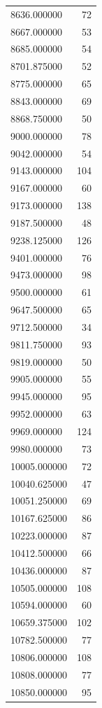 \begin{tabular}{lr}
8636.000000   &    72 \\
8667.000000   &    53 \\
8685.000000   &    54 \\
8701.875000   &    52 \\
8775.000000   &    65 \\
8843.000000   &    69 \\
8868.750000   &    50 \\
9000.000000   &    78 \\
9042.000000   &    54 \\
9143.000000   &   104 \\
9167.000000   &    60 \\
9173.000000   &   138 \\
9187.500000   &    48 \\
9238.125000   &   126 \\
9401.000000   &    76 \\
9473.000000   &    98 \\
9500.000000   &    61 \\
9647.500000   &    65 \\
9712.500000   &    34 \\
9811.750000   &    93 \\
9819.000000   &    50 \\
9905.000000   &    55 \\
9945.000000   &    95 \\
9952.000000   &    63 \\
9969.000000   &   124 \\
9980.000000   &    73 \\
10005.000000  &    72 \\
10040.625000  &    47 \\
10051.250000  &    69 \\
10167.625000  &    86 \\
10223.000000  &    87 \\
10412.500000  &    66 \\
10436.000000  &    87 \\
10505.000000  &   108 \\
10594.000000  &    60 \\
10659.375000  &   102 \\
10782.500000  &    77 \\
10806.000000  &   108 \\
10808.000000  &    77 \\
10850.000000  &    95 \\

\end{tabular}
